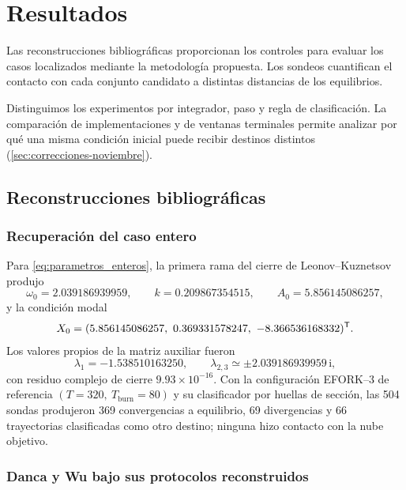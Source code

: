 \section{Resultados}
\label{sec:resultados}

Las reconstrucciones bibliográficas proporcionan los controles para evaluar
los casos localizados mediante la metodología propuesta. Los sondeos
cuantifican el contacto con cada conjunto candidato a distintas distancias
de los equilibrios.

Distinguimos los experimentos por integrador, paso y regla de clasificación.
La comparación de implementaciones y de ventanas terminales permite analizar
por qué una misma condición inicial puede recibir destinos distintos
(\cref{sec:correcciones-noviembre}).

\subsection{Reconstrucciones bibliográficas}
\label{subsec:resultados_bibliograficos}

\subsubsection{Recuperación del caso entero}

Para \cref{eq:parametros_enteros}, la primera rama del cierre de
Leonov--Kuznetsov produjo
\begin{equation}
\omega_0=2.039186939959,\qquad
k=0.209867354515,\qquad
A_0=5.856145086257,
\label{eq:resultados_armonicos_enteros}
\end{equation}
y la condición modal
\begin{equation}
X_0=(5.856145086257,\ 0.369331578247,\ -8.366536168332)^{\T}.
\label{eq:resultado_semilla_entera}
\end{equation}
Los valores propios de la matriz auxiliar fueron
\[
\lambda_1=-1.538510163250,\qquad
\lambda_{2,3}\simeq\pm2.039186939959\,\mathrm i,
\]
con residuo complejo de cierre \(9.93\times10^{-16}\). Con la configuración
EFORK--3 de referencia \((T=320,\ T_{\mathrm{burn}}=80)\) y su clasificador por
huellas de sección, las 504 sondas produjeron 369 convergencias a equilibrio,
69 divergencias y 66 trayectorias clasificadas como otro destino; ninguna hizo
contacto con la nube objetivo.

\subsubsection{Danca y Wu bajo sus protocolos reconstruidos}

